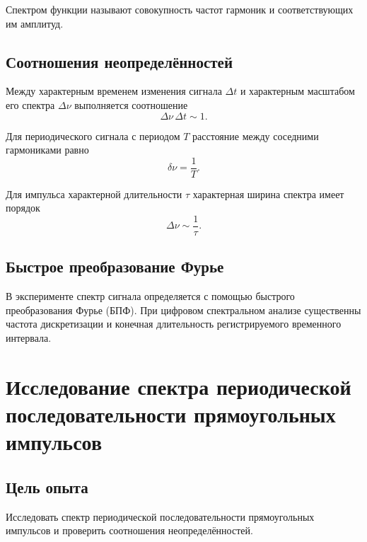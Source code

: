 \documentclass[14pt,a4paper]{extarticle}
\begin{document}
Спектром функции называют совокупность частот гармоник и соответствующих
им амплитуд.

\subsection{Соотношения неопределённостей}

Между характерным временем изменения сигнала $\Delta t$ и характерным
масштабом его спектра $\Delta\nu$ выполняется соотношение
\begin{equation}
\Delta\nu\,\Delta t\sim1.
\end{equation}

Для периодического сигнала с периодом $T$ расстояние между соседними
гармониками равно
\begin{equation}
\delta\nu=\frac{1}{T}.
\end{equation}

Для импульса характерной длительности $\tau$ характерная ширина спектра
имеет порядок
\begin{equation}
\Delta\nu\sim\frac{1}{\tau}.
\end{equation}

\subsection{Быстрое преобразование Фурье}

В эксперименте спектр сигнала определяется с помощью быстрого
преобразования Фурье (БПФ). При цифровом спектральном анализе существенны
частота дискретизации и конечная длительность регистрируемого временного
интервала.

\newpage


\section{Исследование спектра периодической последовательности
прямоугольных импульсов}

\subsection{Цель опыта}

Исследовать спектр периодической последовательности прямоугольных
импульсов и проверить соотношения неопределённостей.
\end{document}
